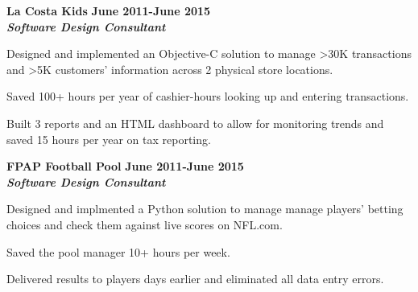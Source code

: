 \documentclass[10pt]{article}
\newcommand{\thing}[1][]{\item #1}
\newcommand{\dates}[2]{
    \textbf{#1-#2}
}
\begin{document}
    \textbf{\large La Costa Kids} \hfill \dates{June 2011}{June 2015}\\
    \textit{\textbf{Software Design Consultant}}
    \begin{things}
        \thing Designed and implemented an Objective-C solution to
                manage \textgreater30K transactions and \textgreater5K
                customers' information across 2 physical store locations.
        \thing Saved 100+ hours per year of cashier-hours looking
                up and entering transactions.
        \thing Built 3 reports and an HTML dashboard to allow for
                monitoring trends and saved 15 hours per year on tax reporting.
    \end{things}

    \textbf{\large FPAP Football Pool} \hfill \dates{June 2011}{June 2015}\\
    \textit{\textbf{Software Design Consultant}}
    \begin{things}
        \thing Designed and implmented a Python solution to manage
                manage players' betting choices and check them against
                live scores on NFL.com.
        \thing Saved the pool manager 10+ hours per week.
        \thing Delivered results to players days earlier and eliminated
                all data entry errors.
    \end{things}


    
\end{document}
